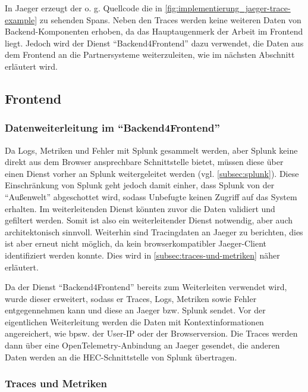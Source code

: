 In Jaeger erzeugt der o. g. Quellcode die in \autoref{fig:implementierung_jaeger-trace-example} zu sehenden Spans. Neben den Traces werden keine weiteren Daten von Backend-Komponenten erhoben, da das Hauptaugenmerk der Arbeit im Frontend liegt. Jedoch wird der Dienst \enquote{Backend4Frontend} dazu verwendet, die Daten aus dem Frontend an die Partnersysteme weiterzuleiten, wie im nächsten Abschnitt erläutert wird.

\subsection{Frontend}

\subsubsection{Datenweiterleitung im \enquote{Backend4Frontend}}

Da Logs, Metriken und Fehler mit Splunk gesammelt werden, aber Splunk keine direkt aus dem Browser ansprechbare Schnittstelle bietet, müssen diese über einen Dienst vorher an Splunk weitergeleitet werden (vgl. \autoref{subsec:splunk}). Diese Einschränkung von Splunk geht jedoch damit einher, dass Splunk von der \enquote{Außenwelt} abgeschottet wird, sodass Unbefugte keinen Zugriff auf das System erhalten. Im weiterleitenden Dienst könnten zuvor die Daten validiert und gefiltert werden. Somit ist also ein weiterleitender Dienst notwendig, aber auch architektonisch sinnvoll. Weiterhin sind Tracingdaten an Jaeger zu berichten, dies ist aber erneut nicht möglich, da kein browserkompatibler Jaeger-Client identifiziert werden konnte. Dies wird in \autoref{subsec:traces-und-metriken} näher erläutert.

Da der Dienst \enquote{Backend4Frontend} bereits zum Weiterleiten verwendet wird, wurde dieser erweitert, sodass er Traces, Logs, Metriken sowie Fehler entgegennehmen kann und diese an Jaeger bzw. Splunk sendet. Vor der eigentlichen Weiterleitung werden die Daten mit Kontextinformationen angereichert, wie bpsw. der User-IP oder der Browserversion. Die Traces werden dann über eine OpenTelemetry-Anbindung an Jaeger gesendet, die anderen Daten werden an die HEC-Schnittstelle \cite{SplunkHEC} von Splunk übertragen.

\subsubsection{Traces und Metriken}
\label{subsec:traces-und-metriken}

